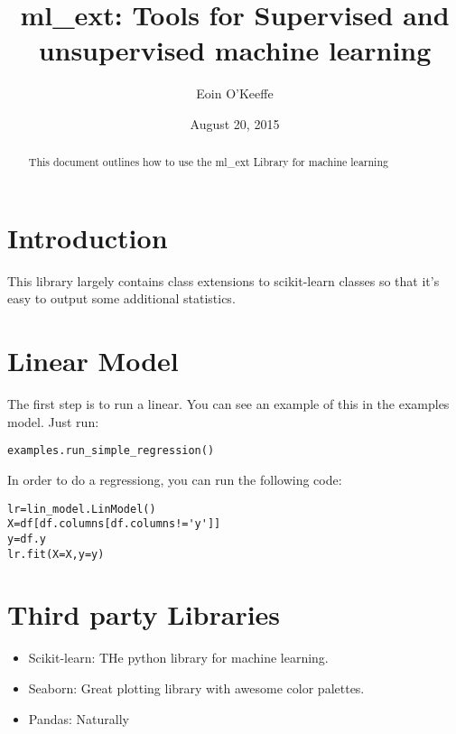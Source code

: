 \documentclass{article}%
\begin{document}
\title{ml_ext: Tools for Supervised and unsupervised machine learning}
\author{Eoin O'Keeffe}
\date{August 20, 2015}
\maketitle

\begin{abstract}
This document outlines how to use the ml_ext Library for machine learning
\end{abstract}

\section{Introduction}
This library largely contains class extensions to scikit-learn classes so that it's easy to output some additional statistics.

\section{Linear Model}
The first step is to run a linear. You can see an example of this in the examples model. Just run:

\begin{lstlisting}
examples.run_simple_regression()
\end{lstlisting}
In order to do a regressiong, you can run the following code:
\begin{lstlisting}
lr=lin_model.LinModel()
X=df[df.columns[df.columns!='y']]
y=df.y
lr.fit(X=X,y=y)
\end{lstlisting}

\appendix
\section{Third party Libraries}
\begin{itemize}
\item Scikit-learn: THe python library for machine learning.
\item Seaborn: Great plotting library with awesome color palettes.
\item Pandas: Naturally
\end{itemize}
\end{document}
